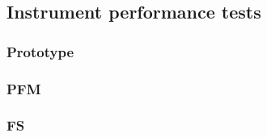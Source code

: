 	
	
	\subsection{Instrument performance tests}
		\subsubsection{Prototype} %
		\subsubsection{PFM} %
		\subsubsection{FS} %
		
